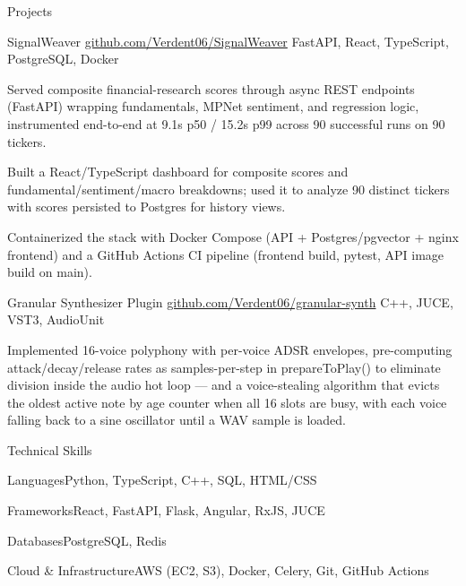 \documentclass[
	11pt
]{../../../template}
\begin{document}
	\begin{rSection}{P}{rojects}
		\begin{rSectionEntry}
			{SignalWeaver}
			{\href{https://github.com/Verdent06/SignalWeaver}{github.com/Verdent06/SignalWeaver}}
			{}
			{FastAPI, React, TypeScript, PostgreSQL, Docker}
			{}

			\item Served composite financial-research scores through async REST endpoints (FastAPI) wrapping fundamentals, MPNet sentiment, and regression logic, instrumented end-to-end at 9.1s p50 / 15.2s p99 across 90 successful runs on 90 tickers.
			\item Built a React/TypeScript dashboard for composite scores and fundamental/sentiment/macro breakdowns; used it to analyze 90 distinct tickers with scores persisted to Postgres for history views.
			\item Containerized the stack with Docker Compose (API + Postgres/pgvector + nginx frontend) and a GitHub Actions CI pipeline (frontend build, pytest, API image build on main).
		\end{rSectionEntry}

		\begin{rSectionEntry}
			{Granular Synthesizer Plugin}
			{\href{https://github.com/Verdent06/granular-synth}{github.com/Verdent06/granular-synth}}
			{}
			{C++, JUCE, VST3, AudioUnit}
			{}

			\item Implemented 16-voice polyphony with per-voice ADSR envelopes, pre-computing attack/decay/release rates as samples-per-step in prepareToPlay() to eliminate division inside the audio hot loop --- and a voice-stealing algorithm that evicts the oldest active note by age counter when all 16 slots are busy, with each voice falling back to a sine oscillator until a WAV sample is loaded.
		\end{rSectionEntry}
	\end{rSection}

	\begin{rSection}{T}{echnical Skills}
		\begin{rSet}{Languages}{Python, TypeScript, C++, SQL, HTML/CSS}
		\end{rSet}
		\begin{rSet}{Frameworks}{React, FastAPI, Flask, Angular, RxJS, JUCE}
		\end{rSet}
		\begin{rSet}{Databases}{PostgreSQL, Redis}
		\end{rSet}
		\begin{rSet}{Cloud \& Infrastructure}{AWS (EC2, S3), Docker, Celery, Git, GitHub Actions}
		\end{rSet}
	\end{rSection}
\end{document}
